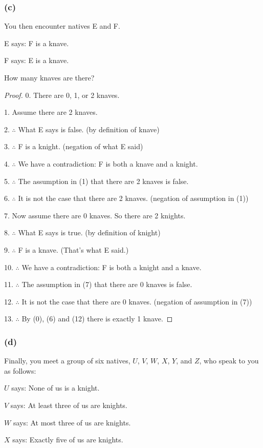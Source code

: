 \documentclass[14pt]{extarticle}
\begin{document}
\subsubsection{(c)}
You then encounter natives E and F.

E says: F is a knave.

F says: E is a knave.

How many knaves are there?

\begin{proof}
0. There are 0, 1, or 2 knaves.

1. Assume there are 2 knaves.

2. $\therefore$ What E says is false. (by definition of knave)

3. $\therefore$ F is a knight. (negation of what E said)

4. $\therefore$ We have a contradiction: F is both a knave and a knight.

5. $\therefore$ The assumption in (1) that there are 2 knaves is false.

6. $\therefore$ It is not the case that there are 2 knaves. (negation of
assumption in (1))

7. Now assume there are 0 knaves. So there are 2 knights.

8. $\therefore$ What E says is true. (by definition of knight)

9. $\therefore$ F is a knave. (That's what E said.)

10. $\therefore$ We have a contradiction: F is both a knight and a knave.

11. $\therefore$ The assumption in (7) that there are 0 knaves is false.

12. $\therefore$ It is not the case that there are 0 knaves. (negation of
assumption in (7))

13. $\therefore$ By (0), (6) and (12) there is exactly 1 knave.
\end{proof}

\subsubsection{(d)}
Finally, you meet a group of six natives, $U$, $V$, $W$, $X$, $Y$, and $Z$, who
speak to you as follows:

$U$ says: None of us is a knight.

$V$ says: At least three of us are knights.

$W$ says: At most three of us are knights.

$X$ says: Exactly five of us are knights.
\end{document}
